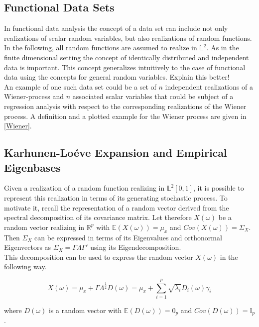 \documentclass[11pt,twoside,a4paper]{article}
\begin{document}
	\subsection{Functional Data Sets}
	In functional data analysis the concept of a data set can include not only realizations of scalar random variables, but also realizations of random functions. In the following, all random functions are assumed to realize in $\mathbb{L}^2$. As in the finite dimensional setting the concept of identically distributed and independent data is important. This concept generalizes intuitively to the case of functional data using the concepts for general random variables. {\color{red} Explain this better!}\\
	An example of one such data set could be a set of $n$ independent realizations of a Wiener-process and $n$ associated scalar variables that could be subject of a regression analysis with respect to the corresponding realizations of the Wiener process. A definition and a plotted example for the Wiener process are given in \ref{Wiener}.
	
	\subsection{Karhunen-Lo\'{e}ve Expansion and Empirical Eigenbases}\hypertarget{KL}{}
	Given a realization of a random function realizing in $\mathbb{L}^2[0,1]$, it is possible to represent this realization in terms of its generating stochastic process. To motivate it, recall the representation of a random vector derived from the spectral decomposition of its covariance matrix. Let therefore $X(\omega)$ be a random vector realizing in $\mathbb{R}^{p}$ with $\mathbb{E}(X(\omega)) = \mu_x$ and $Cov(X(\omega)) = \Sigma_X$. Then $\Sigma_X$ can be expressed in terms of its Eigenvalues and orthonormal Eigenvectors as $\Sigma_X = \Gamma \Lambda \Gamma'$ using its Eigendecomposition.\\
		
	This decomposition can be used to express the random vector $X(\omega)$ in the following way.
	
	\begin{equation}
		X(\omega) = \mu_x + \Gamma \Lambda^{\frac{1}{2}} D(\omega) = \mu_x + \sum_{i = 1}^{p} \sqrt{\lambda_i} D_i(\omega) \gamma_i
	\end{equation}
	
	where $D(\omega)$ is a random vector with $\mathbb{E}(D(\omega)) = 0_p$ and $Cov(D(\omega)) = \mathbb{I}_p$.\\
	
\end{document}
